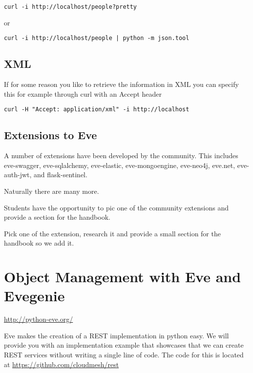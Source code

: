 \begin{lstlisting}
curl -i http://localhost/people?pretty
\end{lstlisting}

or

\begin{lstlisting}
curl -i http://localhost/people | python -m json.tool
\end{lstlisting}

\subsection{XML}

If for some reason you like to retrieve the information in XML you can
specify this for example through curl with an Accept header

\begin{lstlisting}
curl -H "Accept: application/xml" -i http://localhost
\end{lstlisting}


\subsection{Extensions to Eve}

A number of extensions have been developed by the community. This
includes
eve-swagger,
eve-sqlalchemy,
eve-elastic,
eve-mongoengine,
eve-neo4j,
eve.net,
eve-auth-jwt, and
flask-sentinel.

Naturally there are many more.

Students have the opportunity to pic one of the community extensions
and provide a section for the handbook.

\begin{exercise}
Pick one of the extension, research it and provide a small section for
the handbook so we add it.
\end{exercise}

\section{Object Management with Eve and Evegenie}


\url{http://python-eve.org/}

Eve makes the creation of a REST implementation in python easy.  We
will provide you with an implementation example that showcases that we
can create REST services without writing a single line of code. The
code for this is located at \url{https://github.com/cloudmesh/rest}

